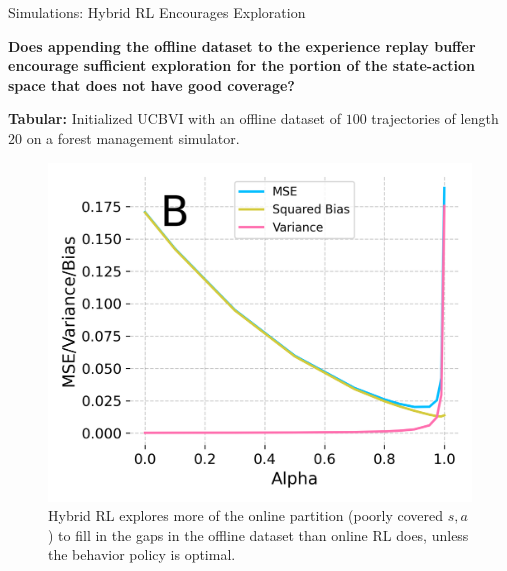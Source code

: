 \documentclass[final]{beamer}
\newcommand{\off}{\operatorname{off}}
\newcommand{\on}{\operatorname{on}}
\newcommand{\gX}{\mathcal{X}}
\newlength{\colwidth}
\begin{document}
\begin{frame}[t]
\begin{columns}[t]
\begin{column}{\colwidth}


  \begin{exampleblock}{Simulations: Hybrid RL Encourages Exploration}

  \textbf{Does appending the offline dataset to the experience replay buffer encourage sufficient exploration for the portion of the state-action space that does not have good coverage?}

  \textbf{Tabular:} Initialized UCBVI \cite{azar2017minimax} with an offline dataset of $100$ trajectories of length $20$ on a forest management simulator. 

\begin{figure}[H]
    \centering
    \includegraphics[scale=1]{imgs/095/biasvar.png}
    \caption{Hybrid RL explores more of the online partition (poorly covered $s,a$) to fill in the gaps in the offline dataset than online RL does, unless the behavior policy is optimal.
    }
\end{figure}


\end{exampleblock}
\end{column}
\end{columns}
\end{frame}
\end{document}
